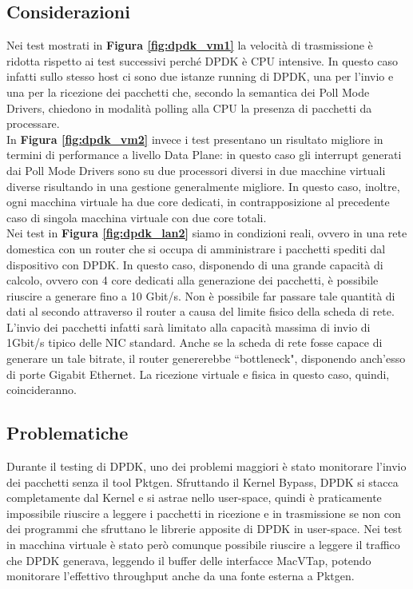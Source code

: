 \label{fig:dpdk_differences}

\subsection*{Considerazioni}
\leavevmode\newline
Nei test mostrati in \textbf{{Figura \ref{fig:dpdk_vm1}}}
 la velocità di trasmissione è ridotta rispetto ai test successivi perché DPDK è CPU intensive. In questo caso infatti sullo stesso host ci sono due istanze running di DPDK, una per l'invio e una per la ricezione dei pacchetti che, secondo la semantica dei Poll Mode Drivers, chiedono in modalità polling alla CPU la presenza di pacchetti da processare.
\leavevmode\newline
\\
In \textbf{{Figura \ref{fig:dpdk_vm2}}} invece i test presentano un risultato migliore in termini di performance a livello Data Plane: in questo caso gli interrupt generati dai Poll Mode Drivers sono su due processori diversi in due macchine virtuali diverse risultando in una gestione generalmente migliore. In questo caso, inoltre, ogni macchina virtuale ha due core dedicati, in contrapposizione al precedente caso di singola macchina virtuale con due core totali.
\leavevmode\newline
\\
Nei test in \textbf{{Figura \ref{fig:dpdk_lan2}}} siamo in condizioni reali, ovvero in una rete domestica con un router che si occupa di amministrare i pacchetti spediti dal dispositivo con DPDK. In questo caso, disponendo di una grande capacità di calcolo, ovvero con 4 core dedicati alla generazione dei pacchetti, è possibile riuscire a generare fino a 10 Gbit/s. Non è possibile far passare tale quantità di dati al secondo attraverso il router a causa del limite fisico della scheda di rete. L'invio dei pacchetti infatti sarà limitato alla capacità massima di invio di 1Gbit/s tipico delle NIC standard. Anche se la scheda di rete fosse capace di generare un tale bitrate, il router genererebbe ``bottleneck", disponendo anch'esso di porte Gigabit Ethernet.
La ricezione virtuale e fisica in questo caso, quindi, coincideranno.

\subsection*{Problematiche}
Durante il testing di DPDK, uno dei problemi maggiori è stato monitorare l'invio dei pacchetti senza il tool Pktgen. Sfruttando il Kernel Bypass, DPDK si stacca completamente dal Kernel e si astrae nello user-space, quindi è praticamente impossibile riuscire a leggere i pacchetti in ricezione e in trasmissione se non con dei programmi che sfruttano le librerie apposite di DPDK in user-space. Nei test in macchina virtuale è stato però comunque possibile riuscire a leggere il traffico che DPDK generava, leggendo il buffer delle interfacce MacVTap, potendo monitorare l'effettivo throughput anche da una fonte esterna a Pktgen.


